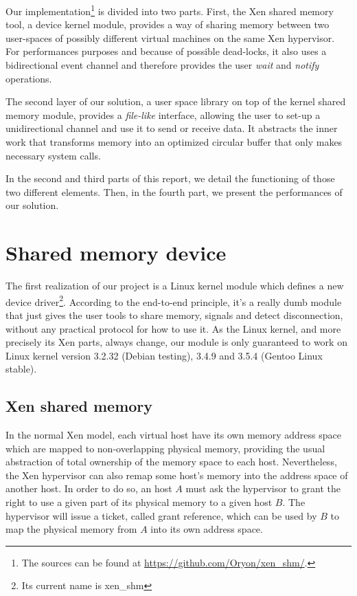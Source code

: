\documentclass[journal]{IEEEtran}
\begin{document}


Our implementation\footnote{The sources can be found at \url{https://github.com/Oryon/xen_shm/}.} is divided into two parts. First, the Xen shared memory tool, a device kernel module, provides a way of sharing memory between two user-spaces of possibly different virtual machines on the same Xen hypervisor. For performances purposes and because of possible dead-locks, it also uses a bidirectional event channel and therefore provides the user \emph{wait} and \emph{notify} operations.

The second layer of our solution, a user space library on top of the kernel shared memory module, provides a \emph{file-like} interface, allowing the user to set-up a unidirectional channel and use it to send or receive data. It abstracts the inner work that transforms memory into an optimized circular buffer that only makes necessary system calls.

In the second and third parts of this report, we detail the functioning of those two different elements. Then, in the fourth part, we present the performances of our solution.

\section{Shared memory device}

The first realization of our project is a Linux kernel module which defines a new device driver\footnote{Its current name is xen\_shm}.
According to the end-to-end principle, it's a really dumb module that just gives the user tools to share memory, signals and detect disconnection, without any practical protocol for how to use it.
As the Linux kernel, and more precisely its Xen parts, always change, our module is only guaranteed to work on Linux kernel version 3.2.32 (Debian testing), 3.4.9 and 3.5.4 (Gentoo Linux stable).

\subsection{Xen shared memory}
\label{xen_shared_memory}

In the normal Xen model, each virtual host have its own memory address space which are mapped to non-overlapping physical memory, providing the usual abstraction of total ownership of the memory space to each host. Nevertheless, the Xen hypervisor can also remap some host's memory into the address space of another host. In order to do so, an host $A$ must ask the hypervisor to grant the right to use a given part of its physical memory to a given host $B$. The hypervisor will issue a ticket, called grant reference, which can be used by $B$ to map the physical memory from $A$ into its own address space.
\end{document}
